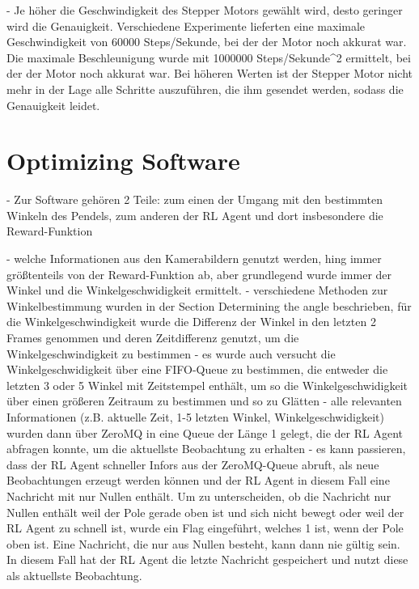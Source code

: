 - Je höher die Geschwindigkeit des Stepper Motors gewählt wird, desto geringer wird die Genauigkeit. Verschiedene Experimente lieferten eine maximale Geschwindigkeit von 60000 Steps/Sekunde, bei der der Motor noch akkurat war. Die maximale Beschleunigung wurde mit 1000000 Steps/Sekunde^2 ermittelt, bei der der Motor noch akkurat war. Bei höheren Werten ist der Stepper Motor nicht mehr in der Lage alle Schritte auszuführen, die ihm gesendet werden, sodass die Genauigkeit leidet.

\section{Optimizing Software}
- Zur Software gehören 2 Teile: zum einen der Umgang mit den bestimmten Winkeln des Pendels, zum anderen der RL Agent und dort insbesondere die Reward-Funktion

- welche Informationen aus den Kamerabildern genutzt werden, hing immer größtenteils von der Reward-Funktion ab, aber grundlegend wurde immer der Winkel und die Winkelgeschwidigkeit ermittelt.
- verschiedene Methoden zur Winkelbestimmung wurden in der Section Determining the angle beschrieben, für die Winkelgeschwindigkeit wurde die Differenz der Winkel in den letzten 2 Frames genommen und deren Zeitdifferenz genutzt, um die Winkelgeschwindigkeit zu bestimmen
- es wurde auch versucht die Winkelgeschwidigkeit über eine FIFO-Queue zu bestimmen, die entweder die letzten 3 oder 5 Winkel mit Zeitstempel enthält, um so die Winkelgeschwidigkeit über einen größeren Zeitraum zu bestimmen und so zu Glätten
- alle relevanten Informationen (z.B. aktuelle Zeit, 1-5 letzten Winkel, Winkelgeschwidigkeit) wurden dann über ZeroMQ in eine Queue der Länge 1 gelegt, die der RL Agent abfragen konnte, um die aktuellste Beobachtung zu erhalten
- es kann passieren, dass der RL Agent schneller Infors aus der ZeroMQ-Queue abruft, als neue Beobachtungen erzeugt werden können und der RL Agent in diesem Fall eine Nachricht mit nur Nullen enthält. Um zu unterscheiden, ob die Nachricht nur Nullen enthält weil der Pole gerade oben ist und sich nicht bewegt oder weil der RL Agent zu schnell ist, wurde ein Flag eingeführt, welches 1 ist, wenn der Pole oben ist. Eine Nachricht, die nur aus Nullen besteht, kann dann nie gültig sein. In diesem Fall hat der RL Agent die letzte Nachricht gespeichert und nutzt diese als aktuellste Beobachtung.

